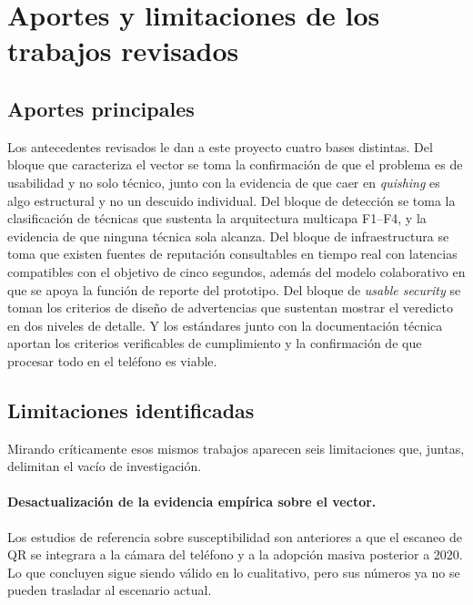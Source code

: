 \section{Aportes y limitaciones de los trabajos revisados}

\subsection{Aportes principales}

Los antecedentes revisados le dan a este proyecto cuatro bases distintas. Del bloque
que caracteriza el vector \cite{krombholz2014qr,vidas2013qrishing} se toma la
confirmación de que el problema es de usabilidad y no solo técnico, junto con la
evidencia de que caer en \emph{quishing} es algo estructural y no un descuido
individual. Del bloque de detección
\cite{sahoo2017malicious,sheng2009empirical,ma2009beyond,le2011phishdef} se toma la
clasificación de técnicas que sustenta la arquitectura multicapa F1--F4, y la evidencia
de que ninguna técnica sola alcanza. Del bloque de infraestructura
\cite{google_safebrowsing,virustotal_apiv3,phishtank_devinfo,urlhaus_api,misp_project}
se toma que existen fuentes de reputación consultables en tiempo real con latencias
compatibles con el objetivo de cinco segundos, además del modelo colaborativo en que se
apoya la función de reporte del prototipo. Del bloque de \emph{usable security}
\cite{cranor2008framework,egelman2008warned,akhawe2013alice} se toman los criterios de
diseño de advertencias que sustentan mostrar el veredicto en dos niveles de detalle. Y
los estándares \cite{owasp2024masvs,iso18004_2015,iso18004_2024} junto con la
documentación técnica
\cite{apple_vndetectbarcodes,google_mlkit_barcode,rousavy_visioncamera,apple2024platformsecurity,apple_ats,android_netsecconfig}
aportan los criterios verificables de cumplimiento y la confirmación de que procesar
todo en el teléfono es viable.

\subsection{Limitaciones identificadas}

Mirando críticamente esos mismos trabajos aparecen seis limitaciones que, juntas,
delimitan el vacío de investigación.

\paragraph{Desactualización de la evidencia empírica sobre el vector.}
Los estudios de referencia sobre susceptibilidad
\cite{krombholz2014qr,vidas2013qrishing} son anteriores a que el escaneo de QR se
integrara a la cámara del teléfono y a la adopción masiva posterior a 2020. Lo que
concluyen sigue siendo válido en lo cualitativo, pero sus números ya no se pueden
trasladar al escenario actual.

